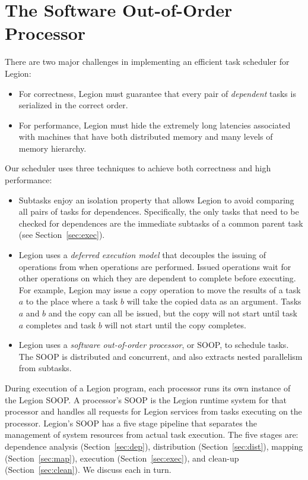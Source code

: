 \section{The Software Out-of-Order Processor}
\label{sec:soop}

There are two major challenges in implementing an efficient task
scheduler for Legion:
\begin{itemize}
\item  For correctness, Legion must guarantee that every pair of {\em dependent} tasks is serialized in the correct order.

\item For performance, Legion must hide the extremely long latencies associated
  with machines that have both distributed memory and many levels of
  memory hierarchy.
\end{itemize}
Our scheduler uses three techniques to achieve both correctness and high performance:
\begin{itemize}
\item Subtasks enjoy an isolation property that allows Legion
to avoid comparing all pairs of tasks for dependences.
Specifically, the only tasks that need to be checked for dependences 
are the immediate subtasks of a common
parent task (see Section~\ref{sec:exec}).

\item Legion uses a {\em deferred execution model} that decouples the issuing
of operations from when operations are performed.  Issued operations wait for other operations on
which they are dependent to complete before executing.  For example, Legion may issue a copy
operation to move the results of a task $a$ to the place where a task $b$ will take the copied data as
an argument.  Tasks $a$ and $b$ and the copy can all be issued, but the copy will not start until
task $a$ completes and task $b$ will not start until the copy completes.

\item Legion uses a {\em  software out-of-order processor}, or SOOP, to schedule tasks.  The SOOP 
is distributed and concurrent, and also extracts nested parallelism from subtasks.
\end{itemize}

During execution of a Legion program, each processor runs its own instance of the Legion SOOP.
A processor's SOOP is the Legion runtime system for that processor and handles all requests
for Legion services from tasks executing on the processor.
Legion's SOOP has a five stage pipeline that  separates the management of system resources from actual
task execution.  The five stages are: dependence analysis (Section~\ref{sec:dep}),
distribution (Section~\ref{sec:dist}),
mapping (Section~\ref{sec:map}),
execution (Section~\ref{sec:exec}),
and clean-up (Section~\ref{sec:clean}).
We discuss each in turn.

